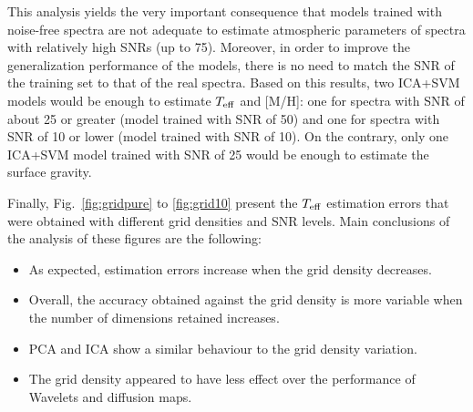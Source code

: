 \documentclass[a4paper,fleqn,usenatbib]{mnras}
\begin{document}
{{{This analysis yields the very important consequence that models
trained with noise-free spectra are not adequate to estimate
atmospheric parameters of spectra with relatively high SNRs (up to
75). Moreover, in order to improve the generalization performance of
the models, there is no need to match the SNR of the training set to
that of the real spectra. Based on this results, two ICA+SVM models
would be enough to estimate $T_{\rm eff}$ and [M/H]: one for spectra
with SNR of about 25 or greater (model trained with SNR of 50) and one
for spectra with SNR of 10 or lower (model trained with SNR of 10).
On the contrary, only one ICA+SVM model trained with SNR of 25 would
be enough to estimate the surface gravity.

Finally, Fig.~\ref{fig:gridpure} to \ref{fig:grid10} present the
$T_{\rm eff}$ estimation errors that were obtained with different 
grid densities and SNR levels. Main conclusions of the analysis 
of these figures are the following:

\begin{itemize}
\item As expected, estimation errors increase when the grid 
	density decreases.
\item Overall, the accuracy obtained against the grid density 
	is more variable when the number of dimensions retained 
	increases. 
\item PCA and ICA show a similar behaviour to the grid density 
	variation. 
\item The grid density appeared to have less effect over the 
	performance of Wavelets and diffusion maps.
\end{itemize}


}}}
\end{document}

